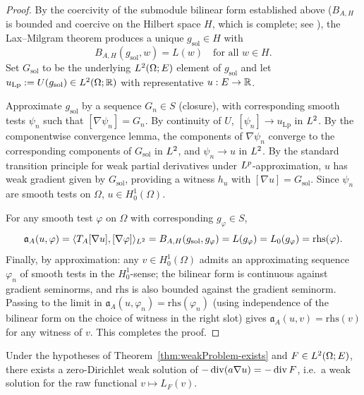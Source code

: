 \begin{proof}
By the coercivity of the submodule bilinear form established above ($B_{A,H}$ is bounded and coercive on the Hilbert space $H$, which is complete; see ), the Lax--Milgram theorem produces a unique $g_{\mathrm{sol}} \in H$ with
\begin{equation*}
  B_{A,H}(g_{\mathrm{sol}}, w) = L(w) \quad \text{for all } w \in H.
\end{equation*}
Set $G_{\mathrm{sol}}$ to be the underlying $L^{2}(\Omega;E)$ element of $g_{\mathrm{sol}}$ and let $u_{\mathrm{Lp}} := U(g_{\mathrm{sol}}) \in L^{2}(\Omega;\mathbb{R})$ with representative $u : E \to \mathbb{R}$.

Approximate $g_{\mathrm{sol}}$ by a sequence $G_n \in S$ (closure), with corresponding smooth tests $\psi_n$ such that $[\nabla \psi_n] = G_n$. By continuity of $U$, $[\psi_n] \to u_{\mathrm{Lp}}$ in $L^{2}$. By the componentwise convergence lemma, the components of $\nabla \psi_n$ converge to the corresponding components of $G_{\mathrm{sol}}$ in $L^{2}$, and $\psi_n \to u$ in $L^{2}$. By the standard transition principle for weak partial derivatives under $L^{p}$-approximation, $u$ has weak gradient given by $G_{\mathrm{sol}}$, providing a witness $h_u$ with $[\nabla u] = G_{\mathrm{sol}}$. Since $\psi_n$ are smooth tests on $\Omega$, $u \in H^{1}_{0}(\Omega)$.

For any smooth test $\varphi$ on $\Omega$ with corresponding $g_\varphi \in S$,
\begin{equation*}
  \mathfrak{a}_A(u, \varphi) = \langle T_A [\nabla u], [\nabla \varphi]\rangle_{L^{2}} = B_{A,H}(g_{\mathrm{sol}}, g_\varphi) = L(g_\varphi) = L_0(g_\varphi) = \mathrm{rhs}(\varphi).
\end{equation*}
Finally, by approximation: any $v \in H^{1}_{0}(\Omega)$ admits an approximating sequence $\varphi_n$ of smooth tests in the $H^{1}_{0}$-sense; the bilinear form is continuous against gradient seminorms, and $\mathrm{rhs}$ is also bounded against the gradient seminorm. Passing to the limit in $\mathfrak{a}_A(u, \varphi_n) = \mathrm{rhs}(\varphi_n)$ (using independence of the bilinear form on the choice of witness in the right slot) gives $\mathfrak{a}_A(u, v) = \mathrm{rhs}(v)$ for any witness of $v$. This completes the proof.
\end{proof}

\begin{theorem}
\label{thm:weakProblem_exists_of_divergenceData}
\leanok
{}
Under the hypotheses of Theorem~\ref{thm:weakProblem-exists} and $F \in L^{2}(\Omega; E)$, there exists a zero-Dirichlet weak solution of $-\operatorname{div}(a\nabla u) = -\operatorname{div} F$, i.e.\ a weak solution for the raw functional $v \mapsto L_F(v)$.
\end{theorem}

